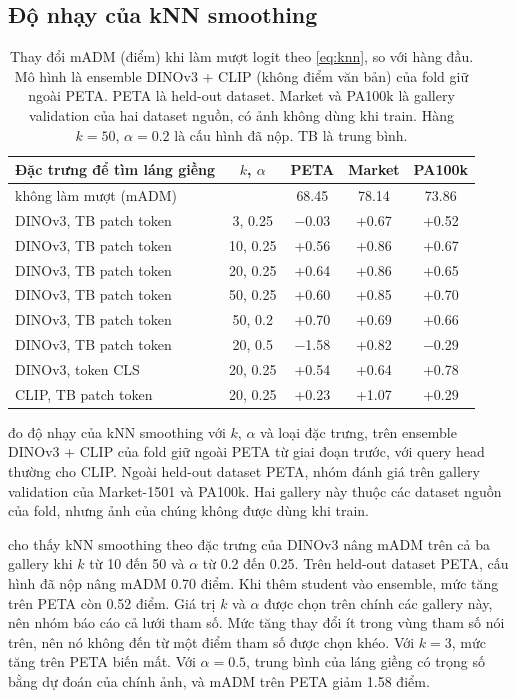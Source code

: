 \documentclass[10pt,twocolumn,letterpaper]{article}
\begin{document}
\subsection{Độ nhạy của kNN smoothing}
\label{sec:knn}

\begin{table}[t]
\centering
\small
\setlength{\tabcolsep}{3.5pt}
\begin{tabular}{@{}lcccc@{}}
\toprule
Đặc trưng để tìm láng giềng & $k$, $\alpha$ & PETA & Market & PA100k \\
\midrule
không làm mượt (mADM) & & 68.45 & 78.14 & 73.86 \\
\midrule
DINOv3, TB patch token & 3, 0.25 & $-$0.03 & +0.67 & +0.52 \\
DINOv3, TB patch token & 10, 0.25 & +0.56 & +0.86 & +0.67 \\
DINOv3, TB patch token & 20, 0.25 & +0.64 & +0.86 & +0.65 \\
DINOv3, TB patch token & 50, 0.25 & +0.60 & +0.85 & +0.70 \\
DINOv3, TB patch token & 50, 0.2 & +0.70 & +0.69 & +0.66 \\
DINOv3, TB patch token & 20, 0.5 & $-$1.58 & +0.82 & $-$0.29 \\
DINOv3, token CLS & 20, 0.25 & +0.54 & +0.64 & +0.78 \\
CLIP, TB patch token & 20, 0.25 & +0.23 & +1.07 & +0.29 \\
\bottomrule
\end{tabular}
\caption{Thay đổi mADM (điểm) khi làm mượt logit theo \cref{eq:knn}, so với hàng đầu. Mô hình là ensemble DINOv3 + CLIP (không điểm văn bản) của fold giữ ngoài PETA. PETA là held-out dataset. Market và PA100k là gallery validation của hai dataset nguồn, có ảnh không dùng khi train. Hàng $k=50$, $\alpha=0.2$ là cấu hình đã nộp. TB là trung bình.}
\label{tab:knn}
\end{table}

 đo độ nhạy của kNN smoothing với $k$, $\alpha$ và loại đặc trưng, trên ensemble DINOv3 + CLIP của fold giữ ngoài PETA từ giai đoạn trước, với query head thường cho CLIP. Ngoài held-out dataset PETA, nhóm đánh giá trên gallery validation của Market-1501 và PA100k. Hai gallery này thuộc các dataset nguồn của fold, nhưng ảnh của chúng không được dùng khi train.

 cho thấy kNN smoothing theo đặc trưng của DINOv3 nâng mADM trên cả ba gallery khi $k$ từ 10 đến 50 và $\alpha$ từ 0.2 đến 0.25. Trên held-out dataset PETA, cấu hình đã nộp nâng mADM 0.70 điểm. Khi thêm student vào ensemble, mức tăng trên PETA còn 0.52 điểm. Giá trị $k$ và $\alpha$ được chọn trên chính các gallery này, nên nhóm báo cáo cả lưới tham số. Mức tăng thay đổi ít trong vùng tham số nói trên, nên nó không đến từ một điểm tham số được chọn khéo. Với $k=3$, mức tăng trên PETA biến mất. Với $\alpha=0.5$, trung bình của láng giềng có trọng số bằng dự đoán của chính ảnh, và mADM trên PETA giảm 1.58 điểm.
\end{document}
